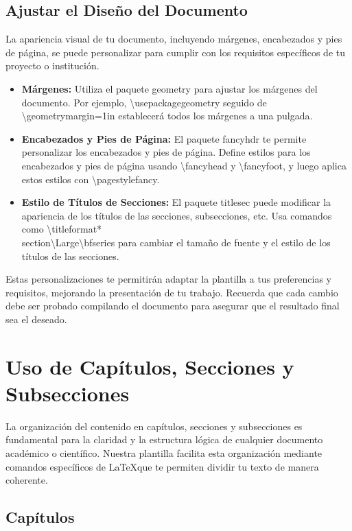 \documentclass[11pt]{article}
\begin{document}
\subsection{Ajustar el Diseño del Documento}

La apariencia visual de tu documento, incluyendo márgenes, encabezados y pies de página, se puede personalizar para cumplir con los requisitos específicos de tu proyecto o institución.

\begin{itemize}
\item \textbf{Márgenes:} Utiliza el paquete geometry para ajustar los márgenes del documento. Por ejemplo, \textbackslash usepackage{geometry} seguido de \textbackslash geometry{margin=1in} establecerá todos los márgenes a una pulgada.
\item \textbf{Encabezados y Pies de Página:} El paquete fancyhdr te permite personalizar los encabezados y pies de página. Define estilos para los encabezados y pies de página usando \textbackslash fancyhead{} y \textbackslash fancyfoot{}, y luego aplica estos estilos con \textbackslash pagestyle{fancy}.
\item \textbf{Estilo de Títulos de Secciones:} El paquete titlesec puede modificar la apariencia de los títulos de las secciones, subsecciones, etc. Usa comandos como \textbackslash titleformat*{\\section}{\textbackslash Large\textbackslash bfseries} para cambiar el tamaño de fuente y el estilo de los títulos de las secciones.
\end{itemize}

Estas personalizaciones te permitirán adaptar la plantilla a tus preferencias y requisitos, mejorando la presentación de tu trabajo. Recuerda que cada cambio debe ser probado compilando el documento para asegurar que el resultado final sea el deseado.


\section{Uso de Capítulos, Secciones y Subsecciones}

La organización del contenido en capítulos, secciones y subsecciones es fundamental para la claridad y la estructura lógica de cualquier documento académico o científico. Nuestra plantilla facilita esta organización mediante comandos específicos de \LaTeX que te permiten dividir tu texto de manera coherente.

\subsection{Capítulos}
\end{document}
